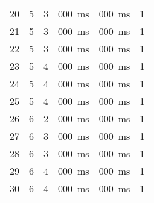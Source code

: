 \begin{tabular}{ |p{0.3cm}||p{1.6cm}|p{1.6cm}||p{1.6cm}|p{1.6cm}|p{1.6cm}| }
    20 &5 &3 &\SI{000}{ms} &\SI{000}{ms} &1 \\
    21 &5 &3 &\SI{000}{ms} &\SI{000}{ms} &1 \\
    22 &5 &3 &\SI{000}{ms} &\SI{000}{ms} &1 \\
    23 &5 &4 &\SI{000}{ms} &\SI{000}{ms} &1 \\
    24 &5 &4 &\SI{000}{ms} &\SI{000}{ms} &1 \\
    25 &5 &4 &\SI{000}{ms} &\SI{000}{ms} &1 \\
    \hline
    26 &6 &2 &\SI{000}{ms} &\SI{000}{ms} &1 \\
    27 &6 &3 &\SI{000}{ms} &\SI{000}{ms} &1 \\
    28 &6 &3 &\SI{000}{ms} &\SI{000}{ms} &1 \\
    29 &6 &4 &\SI{000}{ms} &\SI{000}{ms} &1 \\
    30 &6 &4 &\SI{000}{ms} &\SI{000}{ms} &1 \\
    \hline
   \end{tabular}